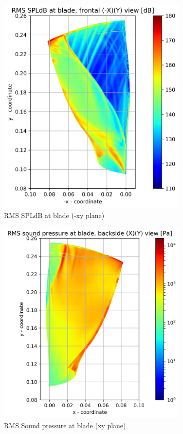\begin{figure}[ht]
	\centering
	\includegraphics[width=0.85\textwidth]{Figures/blade-negxy-rms-spldb.png}
	\caption{RMS SPLdB at blade (-xy plane)} \label{blade-negxy-rms-spldb}
\end{figure}

\begin{figure}[ht]
	\centering
	\includegraphics[width=0.85\textwidth]{Figures/blade-xy-rms-spl.png}
    \caption{RMS Sound pressure at blade (xy plane)} \label{blade-xy-rms-spl}
\end{figure}	

